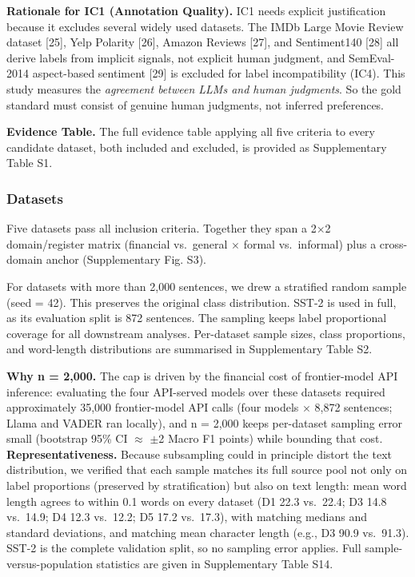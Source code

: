 \documentclass[11pt]{article}
\begin{document}
\textbf{Rationale for IC1 (Annotation Quality).} IC1 needs explicit
justification because it excludes several widely used datasets. The IMDb
Large Movie Review dataset {[}25{]}, Yelp Polarity {[}26{]}, Amazon
Reviews {[}27{]}, and Sentiment140 {[}28{]} all derive labels from
implicit signals, not explicit human judgment, and SemEval-2014
aspect-based sentiment {[}29{]} is excluded for label incompatibility
(IC4). This study measures the \emph{agreement between LLMs and human
judgments}. So the gold standard must consist of genuine human
judgments, not inferred preferences.

\textbf{Evidence Table.} The full evidence table applying all five
criteria to every candidate dataset, both included and excluded, is
provided as Supplementary Table S1.

\subsubsection{Datasets}\label{datasets}

Five datasets pass all inclusion criteria. Together they span a 2$\times$2
domain/register matrix (financial vs.~general $\times$ formal vs.~informal)
plus a cross-domain anchor (Supplementary Fig. S3).

For datasets with more than 2,000 sentences, we drew a stratified random
sample (seed = 42). This preserves the original class distribution.
SST-2 is used in full, as its evaluation split is 872 sentences. The
sampling keeps label proportional coverage for all downstream analyses.
Per-dataset sample sizes, class proportions, and word-length
distributions are summarised in Supplementary Table S2.

\textbf{Why n = 2,000.} The cap is driven by the financial cost of
frontier-model API inference: evaluating the four API-served models over
these datasets required approximately 35,000 frontier-model API calls
(four models $\times$ 8,872 sentences; Llama and VADER ran locally), and n =
2,000 keeps per-dataset sampling error small (bootstrap 95\% CI $\approx$ $\pm$2
Macro F1 points) while bounding that cost. \textbf{Representativeness.}
Because subsampling could in principle distort the text distribution, we
verified that each sample matches its full source pool not only on label
proportions (preserved by stratification) but also on text length: mean
word length agrees to within 0.1 words on every dataset (D1 22.3
vs.~22.4; D3 14.8 vs.~14.9; D4 12.3 vs.~12.2; D5 17.2 vs.~17.3), with
matching medians and standard deviations, and matching mean character
length (e.g., D3 90.9 vs.~91.3). SST-2 is the complete validation split,
so no sampling error applies. Full sample-versus-population statistics
are given in Supplementary Table S14.
\end{document}
